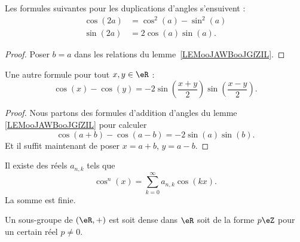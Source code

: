 \begin{corollary}       \label{CORooQZDQooWjMXTF}
	Les formules suivantes pour les duplications d'angles s'ensuivent :
	\begin{subequations}
		\begin{align}
			\cos(2a) & =\cos^2(a)-\sin^2(a)                               \\
			\sin(2a) & =2\cos(a)\sin(a).      \label{SUBEQooLRJDooQuFvux}
		\end{align}
	\end{subequations}
\end{corollary}

\begin{proof}
	Poser \( b=a\) dans les relations du lemme~\ref{LEMooJAWBooJGfZIL}.
\end{proof}

\begin{proposition}	\label{PROPooPMWWooGgGfwr}
	Une autre formule pour tout \( x,y\in \eR\) :
	\begin{equation}
		\cos(x)-\cos(y)=-2\sin\left( \frac{ x+y }{ 2 } \right)\sin\left( \frac{ x-y }{ 2 } \right).
	\end{equation}
\end{proposition}

\begin{proof}
	Nous partons des formules d'addition d'angles du lemme \ref{LEMooJAWBooJGfZIL} pour calculer
	\begin{equation}
		\cos(a+b)-\cos(a-b)=-2\sin(a)\sin(b).
	\end{equation}
	Et il suffit maintenant de poser \( x=a+b\), \( y=a-b\).
\end{proof}


\begin{proposition}	\label{PROPooXGABooBAsbsq}
	Il existe des réels \( a_{n,k}\) tels que
	\begin{equation}
		\cos^n(x)=\sum_{k=0}^{\infty}a_{n,k}\cos(kx).
	\end{equation}
	La somme est finie.
\end{proposition}


\begin{lemma}       \label{LEMooPQWWooMdPWUT}
	Un sous-groupe de \( (\eR,+)\) est soit dense dans \( \eR\) soit de la forme \( p\eZ\) pour un certain réel \( p\neq 0\).
\end{lemma}

